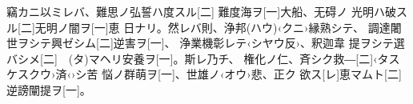 \documentclass[
book,           %
tate,           %
twocolumn,      %
column_gap=3zw, %
paper=a4paper,  %
fontsize=17Q,   %
jafontsize=17Q, %
gutter=30mm,    %
fore-edge=30mm, %
head_space=30mm,%
foot_space=30mm,%
]{jlreq}
\begin{document}
\clearpage
\layout
\Kanbun
竊カニ以ミレバ、難思ノ弘誓ハ度スル[二]
難度海ヲ[一]大船、无碍ノ
光明ハ破スル[二]无明ノ闇ヲ[一]恵
日ナリ。然レバ則、浄邦(ハウ)‹クニ›縁熟シテ、
調達闍世ヲシテ興ゼシム[二]逆害ヲ[一]、
浄業機彰レテ‹シヤウ反›、釈迦韋
提ヲシテ選バシメ[二]　(タ)マヘリ安養ヲ[一]。斯レ乃チ、
権化ノ仁、斉シク救―[二]‹タスケスクウ›済‹›シ苦
悩ノ群萌ヲ[一]、世雄ノ‹オウ›悲、正ク
欲ス[レ]恵マムト[二]逆謗闡提ヲ[一]。
\EndKanbun
\end{document}
